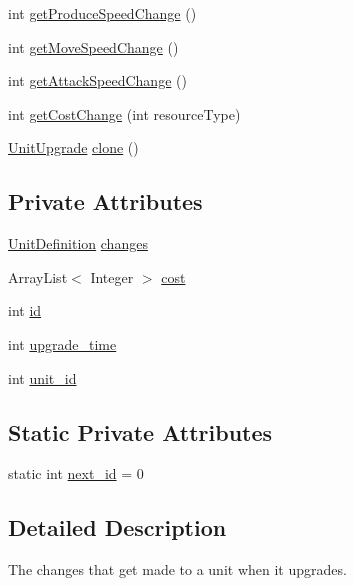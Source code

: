 \begin{DoxyCompactItemize}
\item 
int \hyperlink{classrts_1_1units_1_1_unit_upgrade_afef8b100755cba92cb1fecac39584883}{getProduceSpeedChange} ()
\item 
int \hyperlink{classrts_1_1units_1_1_unit_upgrade_a3abc09dd860755ad23cf11822b568b09}{getMoveSpeedChange} ()
\item 
int \hyperlink{classrts_1_1units_1_1_unit_upgrade_af78f5c8e08408c9f800fccf97fb81c3e}{getAttackSpeedChange} ()
\item 
int \hyperlink{classrts_1_1units_1_1_unit_upgrade_a46e5a0fc389c5adc1b88ab66c570976f}{getCostChange} (int resourceType)
\item 
\hyperlink{classrts_1_1units_1_1_unit_upgrade}{UnitUpgrade} \hyperlink{classrts_1_1units_1_1_unit_upgrade_accb7b6f6420e9c66f2c9c92f689e9f28}{clone} ()
\end{DoxyCompactItemize}
\subsection*{Private Attributes}
\begin{DoxyCompactItemize}
\item 
\hyperlink{classrts_1_1units_1_1_unit_definition}{UnitDefinition} \hyperlink{classrts_1_1units_1_1_unit_upgrade_a8a1f4874a8d64399d6f0a11bafd6acad}{changes}
\item 
ArrayList$<$ Integer $>$ \hyperlink{classrts_1_1units_1_1_unit_upgrade_a887393d251efbd6d1708b021ea8ad5d3}{cost}
\item 
int \hyperlink{classrts_1_1units_1_1_unit_upgrade_ab48ffcbc7f0e7ec226165b4c5da227c8}{id}
\item 
int \hyperlink{classrts_1_1units_1_1_unit_upgrade_aa7c9ebe81b790184b913f2e56c331698}{upgrade\_\-time}
\item 
int \hyperlink{classrts_1_1units_1_1_unit_upgrade_a77ccd316333875fea8cacc2045ea4224}{unit\_\-id}
\end{DoxyCompactItemize}
\subsection*{Static Private Attributes}
\begin{DoxyCompactItemize}
\item 
static int \hyperlink{classrts_1_1units_1_1_unit_upgrade_aaae17d05b9a3bffc0cc1af2ff238f261}{next\_\-id} = 0
\end{DoxyCompactItemize}


\subsection{Detailed Description}
The changes that get made to a unit when it upgrades. 

